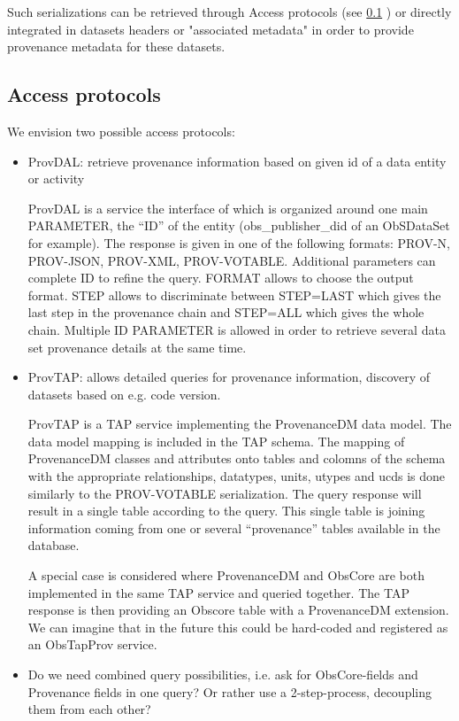 Such serializations can be retrieved through Access protocols (see \ref{AccessPro} ) or directly integrated in datasets headers or "associated metadata" in order to provide provenance metadata for these datasets. 


\subsection{Access protocols}
\label{AccessPro}
We envision two possible access protocols:
\begin{itemize}
\item ProvDAL: retrieve provenance information based on given id of a data entity or activity

ProvDAL is a service the interface of which is organized around one main PARAMETER, the ``ID'' of the entity (obs\_publisher\_did of an ObSDataSet for example). The response is given in one of the following formats: PROV-N, PROV-JSON, PROV-XML, PROV-VOTABLE. Additional parameters can complete ID to refine the query. FORMAT allows to choose the output format. STEP allows to discriminate between STEP=LAST which gives the last step in the provenance chain and STEP=ALL which gives the whole chain.
Multiple ID PARAMETER is allowed in order to retrieve several data set provenance details at the same time.
\item ProvTAP: allows detailed queries for provenance information, discovery of datasets based on 
e.g. code version.

ProvTAP is a TAP service implementing the ProvenanceDM data model. The data model mapping is included in the TAP schema. The mapping of ProvenanceDM classes and attributes onto tables and colomns of the schema with the appropriate relationships, datatypes, units, utypes and ucds is done similarly to the PROV-VOTABLE serialization. The query response will result in a single table according to the query.
 This  single table is joining information coming from one or several ``provenance'' tables available in the database. 

A special case is considered where ProvenanceDM and ObsCore are both implemented in the same TAP service and queried together. The TAP response is then providing an Obscore table with a ProvenanceDM extension. We can imagine that in the future this could be hard-coded and registered as an ObsTapProv service. 


\item Do we need combined query possibilities, i.e. ask for ObsCore-fields and Provenance fields
in one query? Or rather use a 2-step-process, decoupling them from each other?
\end{itemize}


